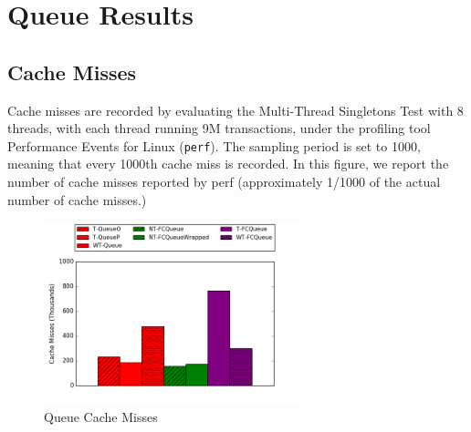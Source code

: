 \chapter{Queue Results}
\label{app:queue}

\vspace{-12pt}
\section{Cache Misses}

Cache misses are recorded by evaluating the Multi-Thread Singletons Test with 8 threads, with each thread running 9M transactions, under the profiling tool Performance Events for Linux (\texttt{perf}). The sampling period is set to 1000, meaning that every 1000th cache miss is recorded.
In this figure, we report the number of cache misses reported by perf (approximately 1/1000 of the actual number of cache misses.)

\begin{figure}[H]
    \centering
    \includegraphics[width=0.66\textwidth]{fcqueues/cm.png}
    \caption{Queue Cache Misses}
\label{fig:cm_queues}
\end{figure}

